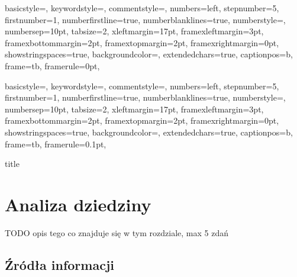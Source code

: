 \documentclass[a4paper,onecolumn,oneside,11pt,wide,floatssmall]{mwrep}
\theoremstyle{definition}
\theoremstyle{plain}%
\theoremstyle{remark}
\begin{document}
{
basicstyle={\footnotesize},
keywordstyle={\bf\footnotesize\color{blue}},
commentstyle={\em\footnotesize\color{magenta}},
numbers=left,
stepnumber=5,
firstnumber=1,
numberfirstline=true,
numberblanklines=true,
numberstyle={\sf\tiny},
numbersep=10pt,
tabsize=2,
xleftmargin=17pt,
framexleftmargin=3pt,
framexbottommargin=2pt,
framextopmargin=2pt,
framexrightmargin=0pt,
showstringspaces=true,
backgroundcolor={\color{ListingBackground}},
extendedchars=true,
captionpos=b,
frame=tb,
framerule=0pt,
}

{
basicstyle={\footnotesize},
keywordstyle={\bf\footnotesize\color{blue}},
commentstyle={\em\footnotesize\color{magenta}},
numbers=left,
stepnumber=5,
firstnumber=1,
numberfirstline=true,
numberblanklines=true,
numberstyle={\sf\tiny},
numbersep=10pt,
tabsize=2,
xleftmargin=17pt,
framexleftmargin=3pt,
framexbottommargin=2pt,
framextopmargin=2pt,
framexrightmargin=0pt,
showstringspaces=true,
backgroundcolor={\color{ListingBackground}},
extendedchars=true,
captionpos=b,
frame=tb,
framerule=0.1pt,
}

\renewcommand*\lstlistingname{Wydruk}
\renewcommand*\lstlistlistingname{Spis wydruków}

\renewcommand{\baselinestretch}{1.0}
\raggedbottom
 {title}

\tableofcontents


\newpage
{}
\setcounter{page}{1}


\chapter{Analiza dziedziny} 
TODO opis tego co znajduje się w tym rozdziale, max 5 zdań


\section{Źródła informacji}
\end{document}
